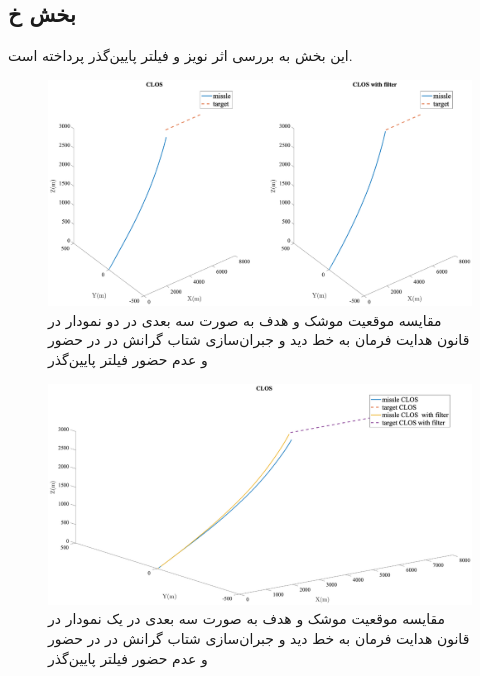 \subsection{بخش خ}
این بخش به بررسی اثر نویز و فیلتر پایین‌گذر پرداخته است.

\begin{figure}[H]
	\centering
	\includegraphics[width=\linewidth]{../Figure/i/3DoF_missle_vs_target_state_CLOS}
	\caption{مقایسه موقعیت موشک و هدف به صورت سه بعدی در دو نمودار در قانون هدایت فرمان به خط دید و جبران‌سازی شتاب گرانش در در حضور و عدم حضور فیلتر پایین‌گذر }
\end{figure}

\begin{figure}[H]
	\centering
	\includegraphics[width=\linewidth]{../Figure/i/3DoF_missle_vs_target_state_CLOS_all_in}
	\caption{مقایسه موقعیت موشک و هدف به صورت سه بعدی در یک نمودار در قانون هدایت فرمان به خط دید و جبران‌سازی شتاب گرانش در در حضور و عدم حضور فیلتر پایین‌گذر }
\end{figure}

